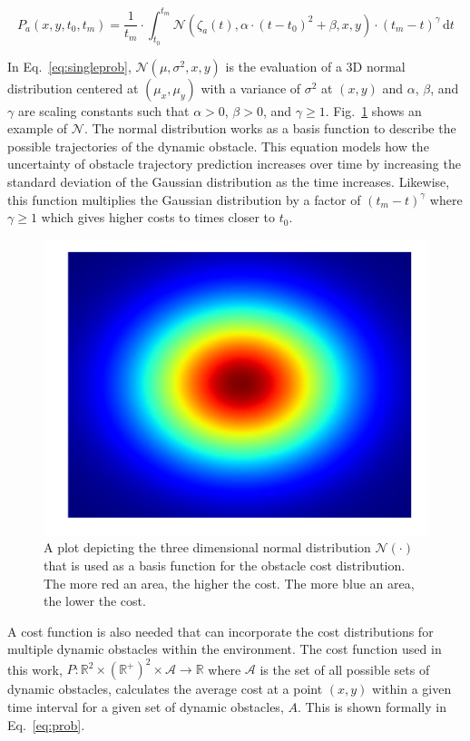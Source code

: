 
\begin{equation}
    P_a(x, y, t_0, t_m) = \frac{1}{t_m} \cdot \int^{t_m}_{t_0}
    \mathcal{N}(\zeta_a(t), \alpha \cdot (t - t_0)^2 + \beta, x, y) \cdot
    (t_m - t)^{\gamma} \,\mathrm{d}t
    \label{eq:singleprob}
\end{equation}

In Eq.~\ref{eq:singleprob}, $\mathcal{N}(\mu, \sigma^2, x, y)$ is the
evaluation of a 3D normal distribution centered at $(\mu_x, \mu_y)$ with a
variance of $\sigma^2$ at $(x, y)$ and $\alpha$, $\beta$, and $\gamma$ are
scaling constants such that $\alpha > 0$, $\beta > 0$, and $\gamma \geq 1$.
Fig.~\ref{fig:normal_3d} shows an example of $\mathcal{N}$. The normal
distribution works as a basis function to describe the possible trajectories of
the dynamic obstacle. This equation models how the uncertainty of obstacle
trajectory prediction increases over time by increasing the standard deviation
of the Gaussian distribution as the time increases.  Likewise, this function
multiplies the Gaussian distribution by a factor of $(t_m - t)^{\gamma}$ where
$\gamma \geq 1$ which gives higher costs to times closer to $t_0$.

\begin{figure}[h!]
    \centering
    \includegraphics[width=0.60\linewidth]{figs/normal_3d}

    \caption{A plot depicting the three dimensional normal distribution
    $\mathcal{N}(\cdot)$ that is used as a basis function for the obstacle cost
distribution. The more red an area, the higher the cost. The more blue an area,
the lower the cost.}

    \label{fig:normal_3d}
\end{figure}

A cost function is also needed that can incorporate the cost distributions for
multiple dynamic obstacles within the environment. The cost function used in
this work, $P: \mathbb{R}^2 \times (\mathbb{R}^+)^2 \times \mathcal{A}
\rightarrow \mathbb{R}$ where $\mathcal{A}$ is the set of all possible sets of
dynamic obstacles, calculates the average cost at a point $(x, y)$ within a
given time interval for a given set of dynamic obstacles, $A$. This is shown
formally in Eq.~\ref{eq:prob}.

